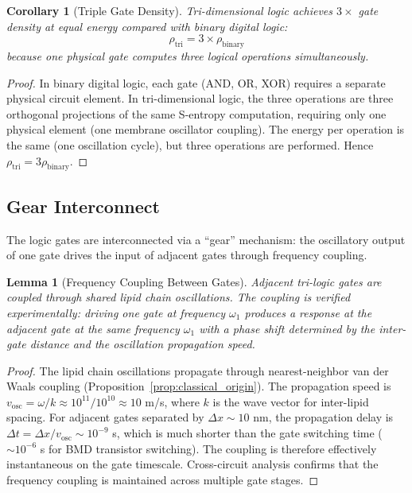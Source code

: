 \documentclass[12pt]{article}
\newtheorem{lemma}[theorem]{Lemma}
\newtheorem{corollary}[theorem]{Corollary}
\theoremstyle{definition}
\theoremstyle{remark}
\begin{document}
\begin{corollary}[Triple Gate Density]
\label{cor:density}
Tri-dimensional logic achieves $3\times$ gate density at equal energy compared with binary digital logic:
\begin{equation}
\label{eq:density}
\rho_{\mathrm{tri}} = 3 \times \rho_{\mathrm{binary}}
\end{equation}
because one physical gate computes three logical operations simultaneously.
\end{corollary}

\begin{proof}
In binary digital logic, each gate (AND, OR, XOR) requires a separate physical circuit element. In tri-dimensional logic, the three operations are three orthogonal projections of the same S-entropy computation, requiring only one physical element (one membrane oscillator coupling). The energy per operation is the same (one oscillation cycle), but three operations are performed. Hence $\rho_{\mathrm{tri}} = 3 \rho_{\mathrm{binary}}$. \qedhere
\end{proof}

\subsection{Gear Interconnect}

The logic gates are interconnected via a ``gear'' mechanism: the oscillatory output of one gate drives the input of adjacent gates through frequency coupling.

\begin{lemma}[Frequency Coupling Between Gates]
\label{lem:gear}
Adjacent tri-logic gates are coupled through shared lipid chain oscillations. The coupling is verified experimentally: driving one gate at frequency $\omega_1$ produces a response at the adjacent gate at the same frequency $\omega_1$ with a phase shift determined by the inter-gate distance and the oscillation propagation speed.
\end{lemma}

\begin{proof}
The lipid chain oscillations propagate through nearest-neighbor van der Waals coupling (Proposition~\ref{prop:classical_origin}). The propagation speed is $v_{\mathrm{osc}} = \omega / k \approx 10^{11} / 10^{10} \approx 10$ m/s, where $k$ is the wave vector for inter-lipid spacing. For adjacent gates separated by $\Delta x \sim 10$ nm, the propagation delay is $\Delta t = \Delta x / v_{\mathrm{osc}} \sim 10^{-9}$ s, which is much shorter than the gate switching time ($\sim 10^{-6}$ s for BMD transistor switching). The coupling is therefore effectively instantaneous on the gate timescale. Cross-circuit analysis confirms that the frequency coupling is maintained across multiple gate stages. \qedhere
\end{proof}
\end{document}
